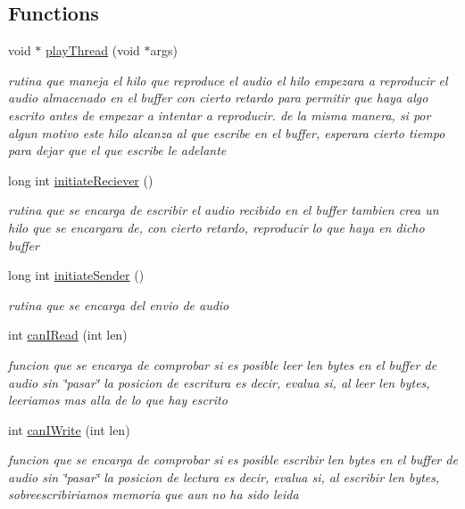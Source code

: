 \subsection*{Functions}
\begin{DoxyCompactItemize}
\item 
void $\ast$ \hyperlink{_g-2301-05-_p2-audio_8c_ab32c5c00416d29c7b60bc91e53cef43a}{play\-Thread} (void $\ast$args)
\begin{DoxyCompactList}\small\item\em rutina que maneja el hilo que reproduce el audio el hilo empezara a reproducir el audio almacenado en el buffer con cierto retardo para permitir que haya algo escrito antes de empezar a intentar a reproducir. de la misma manera, si por algun motivo este hilo alcanza al que escribe en el buffer, esperara cierto tiempo para dejar que el que escribe le adelante \end{DoxyCompactList}\item 
long int \hyperlink{_g-2301-05-_p2-audio_8c_a4d496518d4597c6f8133d109caaf988a}{initiate\-Reciever} ()
\begin{DoxyCompactList}\small\item\em rutina que se encarga de escribir el audio recibido en el buffer tambien crea un hilo que se encargara de, con cierto retardo, reproducir lo que haya en dicho buffer \end{DoxyCompactList}\item 
long int \hyperlink{_g-2301-05-_p2-audio_8c_aba2d08b3de022fdec5162252fe5d3dd8}{initiate\-Sender} ()
\begin{DoxyCompactList}\small\item\em rutina que se encarga del envio de audio \end{DoxyCompactList}\item 
int \hyperlink{_g-2301-05-_p2-audio_8c_a70e78aa07a05a7d1d6688220b711fe0d}{can\-I\-Read} (int len)
\begin{DoxyCompactList}\small\item\em funcion que se encarga de comprobar si es posible leer len bytes en el buffer de audio sin \char`\"{}pasar\char`\"{} la posicion de escritura es decir, evalua si, al leer len bytes, leeriamos mas alla de lo que hay escrito \end{DoxyCompactList}\item 
int \hyperlink{_g-2301-05-_p2-audio_8c_acddb1a586a8305d216deca1d3bd07c29}{can\-I\-Write} (int len)
\begin{DoxyCompactList}\small\item\em funcion que se encarga de comprobar si es posible escribir len bytes en el buffer de audio sin \char`\"{}pasar\char`\"{} la posicion de lectura es decir, evalua si, al escribir len bytes, sobreescribiriamos memoria que aun no ha sido leida \end{DoxyCompactList}\item 

\end{DoxyCompactItemize}
